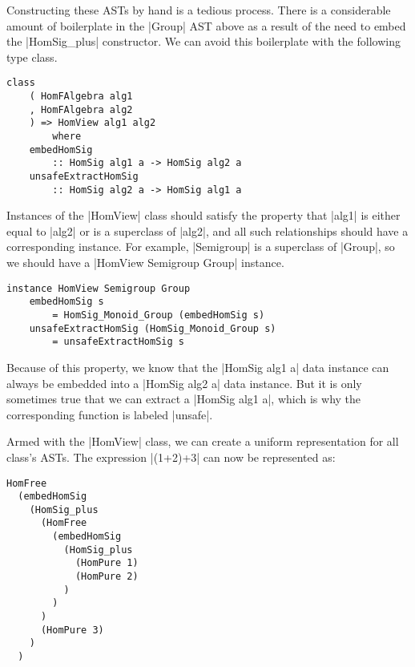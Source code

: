 \documentclass[preprint]{sigplanconf}
\theoremstyle{definition}
\begin{document}
Constructing these ASTs by hand is a tedious process.
There is a considerable amount of boilerplate in the |Group| AST above as a result of the need to embed the |HomSig_plus| constructor.
We can avoid this boilerplate with the following type class.
\begin{lstlisting}
class
    ( HomFAlgebra alg1
    , HomFAlgebra alg2
    ) => HomView alg1 alg2
        where
    embedHomSig
        :: HomSig alg1 a -> HomSig alg2 a
    unsafeExtractHomSig
        :: HomSig alg2 a -> HomSig alg1 a
\end{lstlisting}
Instances of the |HomView| class should satisfy the property that |alg1| is either equal to |alg2| or is a superclass of |alg2|, and
all such relationships should have a corresponding instance.
For example, |Semigroup| is a superclass of |Group|,
so we should have a |HomView Semigroup Group| instance.
\begin{lstlisting}
instance HomView Semigroup Group
    embedHomSig s
        = HomSig_Monoid_Group (embedHomSig s)
    unsafeExtractHomSig (HomSig_Monoid_Group s)
        = unsafeExtractHomSig s
\end{lstlisting}
Because of this property, we know that the |HomSig alg1 a| data instance can always be embedded into a |HomSig alg2 a| data instance.
But it is only sometimes true that we can extract a |HomSig alg1 a|,
which is why the corresponding function is labeled |unsafe|.

Armed with the |HomView| class, we can create a uniform representation for all class's ASTs.
The expression |(1+2)+3| can now be represented as:
\begin{lstlisting}
HomFree
  (embedHomSig
    (HomSig_plus
      (HomFree
        (embedHomSig
          (HomSig_plus
            (HomPure 1)
            (HomPure 2)
          )
        )
      )
      (HomPure 3)
    )
  )
\end{lstlisting}



\end{document}
